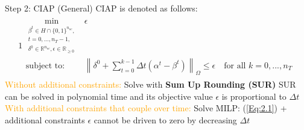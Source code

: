\documentclass[8pt]{beamer}
\newcommand{\norm}[1]{\left\lVert#1\right\rVert} %
\begin{document}
\begin{frame}{Step 2: CIAP (General)}
CIAP is denoted as follows: 
\begin{alignat}{1}
\begin{split}
\min_{\substack{\beta^t \in H \cap \{0,1\}^{n_{oc}},  \\ t =0,...,n_T-1,  \\ \delta^0 \in \mathbb{R}^{n_{oc}},\epsilon \in \mathbb{R}_{\geq 0}}}  &\epsilon      \\
\text{subject to: } \quad &\norm{\delta^0 + \sum_{t=0}^{k-1} \Delta t (\alpha^t-\beta^t)}_{\Omega} \leq \epsilon \quad  \text{for all } k=0,...,n_T
\label{Eq:2.1}
\end{split}
\end{alignat}
\textcolor{orange}{Without additional constraints:} Solve with \textbf{Sum Up Rounding (SUR)} \newline
SUR can be solved in polynomial time and its objective value $\epsilon$ is proportional to $\Delta t$
\newline\newline
\textcolor{orange}{With additional constraints that couple over time:} \newline Solve MILP: (\ref{Eq:2.1}) + additional constraints \newline
$\epsilon$ cannot be driven to zero by decreasing $\Delta t$
\end{frame}
\end{document}
